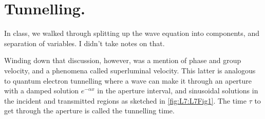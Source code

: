    \section{Tunnelling.}
In class, we walked through splitting up the wave equation into components, and separation of variables.  I didn't take notes on that.

Winding down that discussion, however, was a mention of phase and group velocity, and a phenomena called superluminal velocity.  This latter is analogous to quantum electron tunnelling where a wave can make it through an aperture with a damped solution \( e^{-\alpha x} \) in the aperture interval, and sinusoidal solutions in the incident and transmitted regions as sketched in \cref{fig:L7:L7Fig1}.  The time \( \tau \) to get through the aperture is called the tunnelling time.
